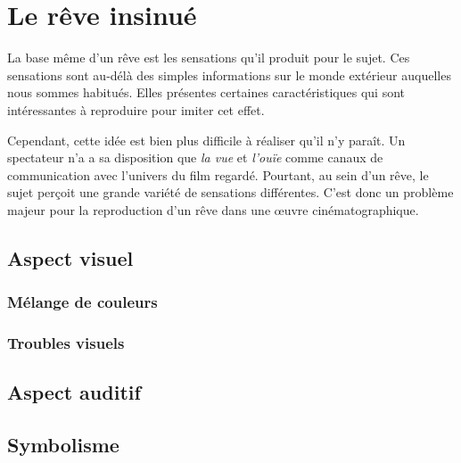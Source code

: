 \documentclass[../main.tex]{subfile}
\begin{document}
\section{Le rêve insinué}

La base même d'un rêve est les sensations qu'il produit pour le sujet. Ces
sensations sont au-délà des simples informations sur le monde extérieur
auquelles nous sommes habitués. Elles présentes certaines caractéristiques qui
sont intéressantes à reproduire pour imiter cet effet.

Cependant, cette idée est bien plus difficile à réaliser qu'il n'y paraît. Un
spectateur n'a a sa disposition que \emph{la vue} et \emph{l'ouïe} comme canaux
de communication avec l'univers du film regardé. Pourtant, au sein d'un rêve,
le sujet perçoit une grande variété de sensations différentes. C'est donc un
problème majeur pour la reproduction d'un rêve dans une \oe{}uvre
cinématographique.

\subsection{Aspect visuel}

\subsubsection{Mélange de couleurs}
\subsubsection{Troubles visuels}

\subsection{Aspect auditif}

\subsection{Symbolisme}
\end{document}
